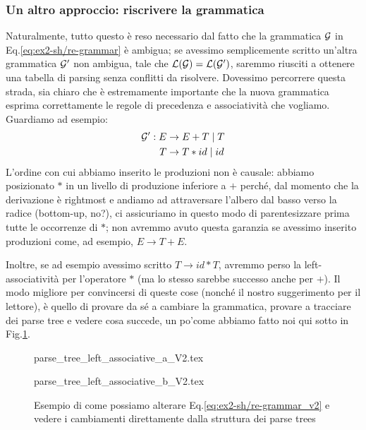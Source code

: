 \documentclass[class=book, crop=false, oneside, 12pt]{standalone}
\begin{document}
\subsubsection{Un altro approccio: riscrivere la grammatica}
Naturalmente, tutto questo è reso necessario dal fatto che la grammatica \(\mathcal{G}\) in Eq.\ref{eq:ex2-sh/re-grammar} è ambigua; se avessimo semplicemente scritto un'altra grammatica \(\mathcal{G}'\) non ambigua, tale che \(\mathcal{L}(\mathcal{G}) = \mathcal{L}(\mathcal{G}')\), saremmo riusciti a ottenere una tabella di parsing senza conflitti da risolvere. Dovessimo percorrere questa strada, sia chiaro che è estremamente importante che la nuova grammatica esprima correttamente le regole di precedenza e associatività che vogliamo. Guardiamo ad esempio:
\begin{align}
    \label{eq:ex2-sh/re-grammar_v2}
    \mathcal{G}': E &\to E + T \mid T \\
    T &\to T * id \mid id \notag
\end{align}
L'ordine con cui abbiamo inserito le produzioni non è causale: abbiamo posizionato \(*\) in un livello di produzione inferiore a \(+\) perché, dal momento che la derivazione è rightmost e andiamo ad attraversare l'albero dal basso verso la radice (bottom-up, no?), ci assicuriamo in questo modo di parentesizzare prima tutte le occorrenze di \(\ast\); non avremmo avuto questa garanzia se avessimo inserito produzioni come, ad esempio, \(E \to T + E\). 

Inoltre, se ad esempio avessimo scritto \(T \to id * T\), avremmo perso la left-associatività per l'operatore \(\ast\) (ma lo stesso sarebbe successo anche per \(+\)). Il modo migliore per convincersi di queste cose (nonché il nostro suggerimento per il lettore), è quello di provare da sé a cambiare la grammatica, provare a tracciare dei parse tree e vedere cosa succede, un po'come abbiamo fatto noi qui sotto in Fig.\ref{fig:ex2-sh_re-altgrm-ptree}.
\begin{figure}[H]
    \begin{minipage}[b]{.4\textwidth}
        \centering
        {parse_tree_left_associative_a_V2.tex}
        \label{fig:ex2-sh_re-altgrm-ptree_1}
    \end{minipage}
    \hfill
    \begin{minipage}[b]{.4\textwidth}
        \centering
        {parse_tree_left_associative_b_V2.tex}
        \label{fig:ex2-sh_re-altgrm-ptree_2}
    \end{minipage}
    \caption{Esempio di come possiamo alterare Eq.\ref{eq:ex2-sh/re-grammar_v2} e vedere i cambiamenti direttamente dalla struttura dei parse trees}
    \label{fig:ex2-sh_re-altgrm-ptree}
\end{figure}
\end{document}

